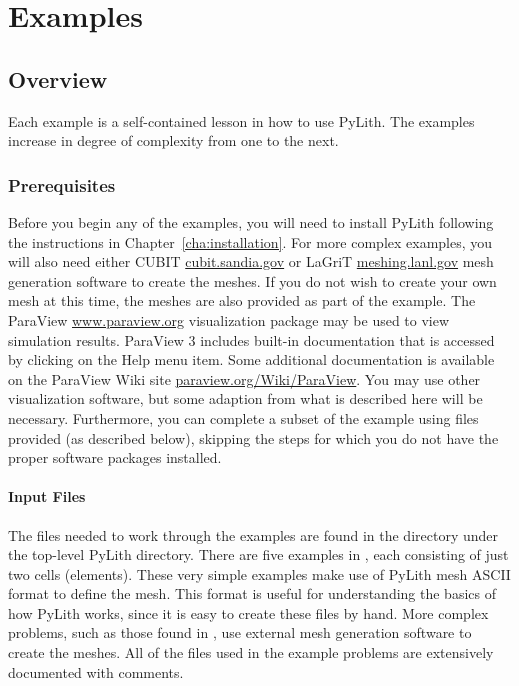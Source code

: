 \chapter{Examples}
\label{cha:examples}

\section{Overview}

Each example is a self-contained lesson in how to use PyLith. The
examples increase in degree of complexity from one to the next.


\subsection{Prerequisites}

Before you begin any of the examples, you will need to install PyLith
following the instructions in Chapter~\vref{cha:installation}.  For
more complex examples, you will also need either CUBIT
\url{cubit.sandia.gov} or LaGriT \url{meshing.lanl.gov} mesh
generation software to create the meshes. If you do not wish to create
your own mesh at this time, the meshes are also provided as part of
the example. The ParaView \url{www.paraview.org} visualization
package may be used to view simulation results. ParaView 3 includes
built-in documentation that is accessed by clicking on the Help menu
item. Some additional documentation is available on the ParaView Wiki
site \url{paraview.org/Wiki/ParaView}.  You may use other
visualization software, but some adaption from what is described here
will be necessary. Furthermore, you can complete a subset of the
example using files provided (as described below), skipping the steps
for which you do not have the proper software packages installed.


\subsubsection{Input Files}

The files needed to work through the examples are found in the
 directory under the top-level PyLith
directory. There are five examples in ,
each consisting of just two cells (elements).  These very simple
examples make use of PyLith mesh ASCII format to define the mesh. This
format is useful for understanding the basics of how PyLith works,
since it is easy to create these files by hand.  More complex
problems, such as those found in , use external
mesh generation software to create the meshes. All of the files used
in the example problems are extensively documented with comments.

